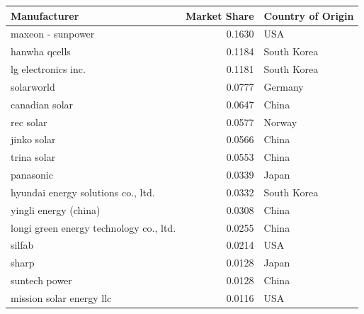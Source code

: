 \begin{table}[t]
\fontsize{12.0pt}{14.4pt}\selectfont
\begin{tabular*}{\linewidth}{@{\extracolsep{\fill}}lrl}
\toprule
Manufacturer & Market Share & Country of Origin \\ 
\midrule\addlinespace[2.5pt]
maxeon - sunpower & 0.1630 & USA \\ 
hanwha qcells & 0.1184 & South Korea \\ 
lg electronics inc. & 0.1181 & South Korea \\ 
solarworld & 0.0777 & Germany \\ 
canadian solar & 0.0647 & China \\ 
rec solar & 0.0577 & Norway \\ 
jinko solar & 0.0566 & China \\ 
trina solar & 0.0553 & China \\ 
panasonic & 0.0339 & Japan \\ 
hyundai energy solutions co., ltd. & 0.0332 & South Korea \\ 
yingli energy (china) & 0.0308 & China \\ 
longi green energy technology co., ltd. & 0.0255 & China \\ 
silfab & 0.0214 & USA \\ 
sharp & 0.0128 & Japan \\ 
suntech power & 0.0128 & China \\ 
mission solar energy llc & 0.0116 & USA \\ 
\bottomrule
\end{tabular*}
\end{table}

